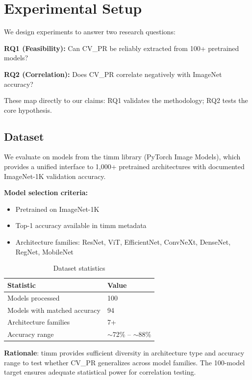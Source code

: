 \section{Experimental Setup}
\label{sec:experiments}

We design experiments to answer two research questions:

\textbf{RQ1 (Feasibility):} Can CV\_PR be reliably extracted from 100+ pretrained models?

\textbf{RQ2 (Correlation):} Does CV\_PR correlate negatively with ImageNet accuracy?

These map directly to our claims: RQ1 validates the methodology; RQ2 tests the core hypothesis.

\subsection{Dataset}

We evaluate on models from the timm library (PyTorch Image Models), which provides a unified interface to 1,000+ pretrained architectures with documented ImageNet-1K validation accuracy.

\textbf{Model selection criteria:}
\begin{itemize}
    \item Pretrained on ImageNet-1K
    \item Top-1 accuracy available in timm metadata
    \item Architecture families: ResNet, ViT, EfficientNet, ConvNeXt, DenseNet, RegNet, MobileNet
\end{itemize}

\begin{table}[h]
\centering
\caption{Dataset statistics}
\label{tab:dataset}
\begin{tabular}{ll}
\toprule
Statistic & Value \\
\midrule
Models processed & 100 \\
Models with matched accuracy & 94 \\
Architecture families & 7+ \\
Accuracy range & $\sim$72\% -- $\sim$88\% \\
\bottomrule
\end{tabular}
\end{table}

\textbf{Rationale}: timm provides sufficient diversity in architecture type and accuracy range to test whether CV\_PR generalizes across model families. The 100-model target ensures adequate statistical power for correlation testing.

